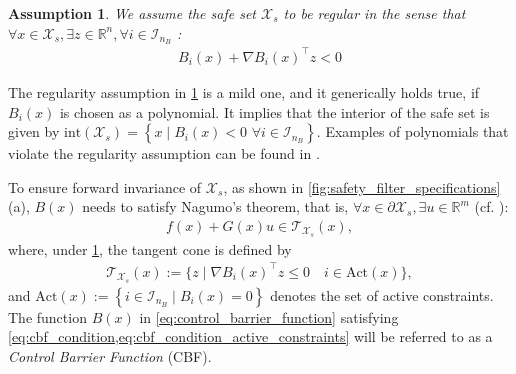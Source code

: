 \documentclass[lettersize,journal]{IEEEtran}
\newcommand{\R}{\mathbb{R}}
\newtheorem{assumption}{Assumption}
\begin{document}
\begin{assumption} \label{ass:regular_safe_set}
   We assume the safe set $\mathcal X_s$ to be regular in the sense that $\forall x \in \mathcal X_s, \exists z \in \R^n, \forall i \in \mathcal I_{n_{\!B}}$ \cite[Def. 4.9]{Blanchini:99}:
   \begin{align*}
      B_i(x) + \nabla B_i(x)^\top z < 0
   \end{align*}
\end{assumption}
The regularity assumption in \cref{ass:regular_safe_set} is a mild one, and it generically holds true, 
if $B_i(x)$ is chosen as a polynomial.
It implies that the interior of the safe set is given by $\text{int} (\mathcal X_s) = \left \{ x \mid B_i(x) < 0 \,\, \forall i \in \mathcal I_{n_{\!B}} \right \}$.
Examples of polynomials that violate the regularity assumption can be found in \cite[Chapter 4.2]{Blanchini:99}.

To ensure forward invariance of $\mathcal X_s$, as shown in \cref{fig:safety_filter_specifications}(a), $B(x)$ needs to satisfy Nagumo's theorem, that is, $\forall x \in \partial \mathcal X_s, \exists u \in \R^m$ (cf. \cite[Nagumo's Theorem 4.7]{Blanchini:99}):
\begin{align} \label{eq:cbf_condition}
   f(x) + G(x) u \in \mathcal T_{\mathcal X_s}(x),
\end{align}
where, under \cref{ass:regular_safe_set}, the tangent cone is defined by
\begin{align} \label{eq:cbf_condition_active_constraints}
   \mathcal T_{\mathcal X_s}(x) := \{ z \mid \nabla B_i(x)^\top z \leq 0 \quad i \in \text{Act}(x) \},
\end{align}
and $\text{Act}(x) := \left\{ i \in \mathcal I_{n_{\!B}} \mid B_i(x) = 0 \right\}$ denotes the set of active constraints.
The function $B(x)$ in \cref{eq:control_barrier_function} satisfying \cref{eq:cbf_condition,eq:cbf_condition_active_constraints} will be referred to as a \emph{Control Barrier Function} (CBF).
\end{document}
